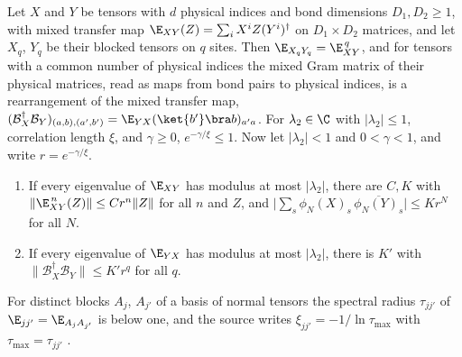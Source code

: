 \begin{lemma}
    \label{lem:ldp_mixed_transfer_decay}
    \leanok
    Let $X$ and $Y$ be tensors with $d$ physical indices and bond dimensions
    $D_1,D_2\geq1$, with mixed transfer map
    $\E_{XY}(Z)=\sum_iX^iZ(Y^i)^\dagger$ on $D_1\times D_2$ matrices, and let
    $X_q$, $Y_q$ be their blocked tensors on $q$ sites. Then
    $\E_{X_qY_q}=\E_{XY}^{\,q}$, and for tensors with a common number of physical
    indices the mixed Gram matrix of their physical matrices, read as maps from bond
    pairs to physical indices, is a rearrangement of the mixed transfer map,
    $(\mathcal B_X^\dagger\mathcal B_Y)_{(a,b),(a',b')}
        =\E_{YX}(\ket{b'}\bra b)_{a'a}$. For $\lambda_2\in\C$ with
    $\lvert\lambda_2\rvert\leq1$, correlation length $\xi$, and $\gamma\geq0$,
    $e^{-\gamma/\xi}\leq1$. Now let $\lvert\lambda_2\rvert<1$ and $0<\gamma<1$, and
    write $r=e^{-\gamma/\xi}$.
    \begin{enumerate}
        \item If every eigenvalue of $\E_{XY}$ has modulus at most
              $\lvert\lambda_2\rvert$, there are $C,K$ with
              $\lVert\E_{XY}^{\,n}(Z)\rVert\leq Cr^n\lVert Z\rVert$ for all $n$ and $Z$,
              and
              $\bigl\lvert\sum_s\phi_N(X)_s\,\overline{\phi_N(Y)_s}\bigr\rvert\leq Kr^N$
              for all $N$.
        \item If every eigenvalue of $\E_{YX}$ has modulus at most
              $\lvert\lambda_2\rvert$, there is $K'$ with
              $\lVert\mathcal B_X^\dagger\mathcal B_Y\rVert\leq K'r^q$ for all $q$.
    \end{enumerate}
    For distinct blocks $A_j$, $A_{j'}$ of a basis of normal tensors the spectral
    radius $\tau_{jj'}$ of $\E_{jj'}=\E_{A_jA_{j'}}$ is below one, and the source
    writes $\xi_{jj'}=-1/\ln\tau_{\max}$ with $\tau_{\max}=\tau_{jj'}$
    \cite[eqs.~(S14)--(S15)]{Malz2024Preparation}.
\end{lemma}
